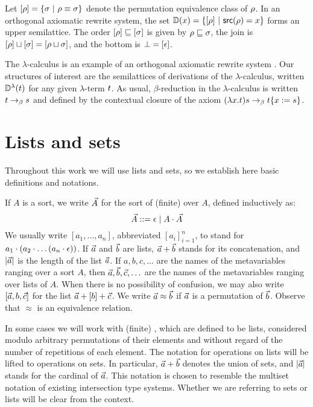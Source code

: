 Let ${[\rho]} = \{\sigma \ |\  \rho \equiv \sigma\}$
denote the permutation equivalence class of $\rho$.
In an orthogonal axiomatic rewrite system,
the set $\mathbb{D}(x) = \{{[\rho]} \ |\  \mathsf{src}(\rho) = x\}$
forms an upper semilattice.
The order ${[\rho]} \sqsubseteq {[\sigma]}$ is given by $\rho \sqsubseteq \sigma$,
the join is ${[\rho]} \sqcup {[\sigma]} = {[\rho \sqcup \sigma]}$,
and the bottom is $\bot = {[\epsilon]}$.

The $\lambda$-calculus is an example of an orthogonal axiomatic rewrite system \cite{thesismellies}.
Our structures of interest are the semilattices of derivations of the $\lambda$-calculus,
written $\mathbb{D}^{\lambda}(t)$ for any given $\lambda$-term $t$.
As usual, $\beta$-reduction in the $\lambda$-calculus
is written $t \mathrel{\to_\beta} s$
and defined by the contextual closure of the axiom $(\lambda x. t)s \mathrel{\to_\beta} t\{x := s\}$.


\section{Lists and sets}

Throughout this work we will use lists and sets, so we establish here basic definitions and notations.

\begin{definition}
If $A$ is a sort, we write $\vec{A}$ for the sort of (finite)  over $A$,
defined inductively as:
\[
  \vec{A} ::= \epsilon \mid A \cdot \vec{A}
  \]
We usually write $[a_1, \hdots, a_n]$,
abbreviated $[a_i]_{i=1}^{n}$,
to stand for $a_1 \cdot (a_2 \cdot \hdots (a_n \cdot \epsilon))$.
If $\vec{a}$ and $\vec{b}$ are lists, $\vec{a} + \vec{b}$ stands for its concatenation,
and $|\vec{a}|$ is the length of the list $\vec{a}$.
If $a,b,c,\hdots$ are the names of the metavariables ranging over a sort $A$,
then $\vec{a},\vec{b},\vec{c},\hdots$
are the names of the metavariables ranging over lists of $A$.
When there is no possibility of confusion, we may also write $[\vec{a},b,\vec{c}]$
for the list $\vec{a} + [b] + \vec{c}$.
We write $\vec{a} \approx \vec{b}$ if $\vec{a}$ is a permutation of $\vec{b}$.
Observe that $\approx$ is an equivalence relation.

In some cases we will work with (finite) ,
which are defined to be lists,
considered modulo arbitrary permutations of their elements
and without regard of the number of repetitions of each element.
The notation for operations on lists will be lifted to operations
on sets.
In particular, $\vec{a} + \vec{b}$ denotes the union of sets,
and $|\vec{a}|$ stands for the cardinal of $\vec{a}$.
This notation is chosen to resemble the multiset notation of existing
intersection type systems. Whether we are referring to sets or lists will be
clear from the context.
\end{definition}





